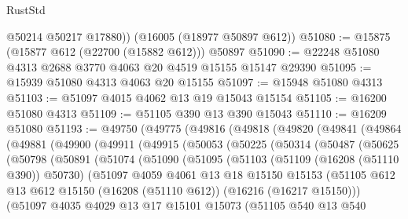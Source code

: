 \begin{lexlean}{RustStd}
\begin{coremodule}
        @50214
        @50217
        @17880))
    (@16005 (@18977 @50897 @612))
@51080 := @15875 (@15877 @612 (@22700 (@15882 @612))) @50897
@51090 := @22248 @51080 @4313 @2688 @3770 @4063 @20 @4519 @15155 @15147 @29390
@51095 := @15939 @51080 @4313 @4063 @20 @15155
@51097 := @15948 @51080 @4313
@51103 := @51097 @4015 @4062 @13 @19 @15043 @15154
@51105 := @16200 @51080 @4313
@51109 := @51105 @390 @13 @390 @15043
@51110 := @16209 @51080
@51193 := @49750
    (@49775
      (@49816
        (@49818
          (@49820
            (@49841
              (@49864
                (@49881
                  (@49900
                    (@49911
                      (@49915
                        (@50053
                          (@50225
                            (@50314
                              (@50487
                                (@50625
                                  (@50798
                                    (@50891
                                      (@51074
                                        (@51090
                                          (@51095
                                            (@51103
                                              (@51109 (@16208 (@51110 @390)) @50730)
                                              (@51097
                                                @4059
                                                @4061
                                                @13
                                                @18
                                                @15150
                                                @15153
                                                (@51105
                                                  @612
                                                  @13
                                                  @612
                                                  @15150
                                                  (@16208 (@51110 @612))
                                                  (@16216 (@16217 @15150)))
                                                (@51097
                                                  @4035
                                                  @4029
                                                  @13
                                                  @17
                                                  @15101
                                                  @15073
                                                  (@51105
                                                    @540
                                                    @13
                                                    @540

\end{coremodule}
\end{lexlean}
